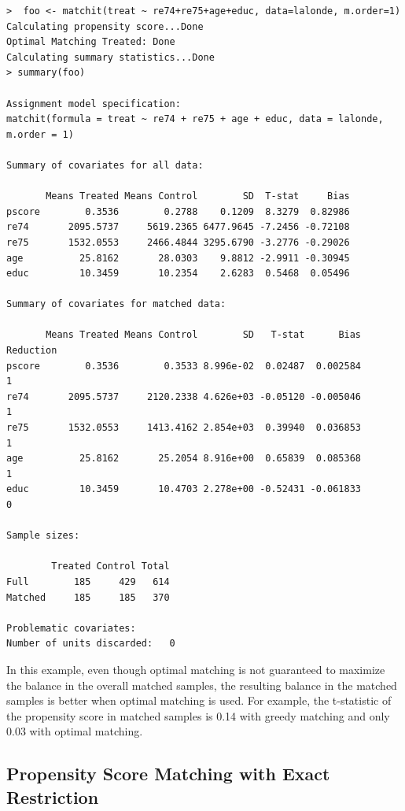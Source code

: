 \documentclass[oneside,letterpaper,titlepage]{article}
\begin{document}
\begin{verbatim}
>  foo <- matchit(treat ~ re74+re75+age+educ, data=lalonde, m.order=1)
Calculating propensity score...Done
Optimal Matching Treated: Done
Calculating summary statistics...Done
> summary(foo)

Assignment model specification:
matchit(formula = treat ~ re74 + re75 + age + educ, data = lalonde,     m.order = 1)

Summary of covariates for all data:

       Means Treated Means Control        SD  T-stat     Bias
pscore        0.3536        0.2788    0.1209  8.3279  0.82986
re74       2095.5737     5619.2365 6477.9645 -7.2456 -0.72108
re75       1532.0553     2466.4844 3295.6790 -3.2776 -0.29026
age          25.8162       28.0303    9.8812 -2.9911 -0.30945
educ         10.3459       10.2354    2.6283  0.5468  0.05496

Summary of covariates for matched data:

       Means Treated Means Control        SD   T-stat      Bias Reduction
pscore        0.3536        0.3533 8.996e-02  0.02487  0.002584         1
re74       2095.5737     2120.2338 4.626e+03 -0.05120 -0.005046         1
re75       1532.0553     1413.4162 2.854e+03  0.39940  0.036853         1
age          25.8162       25.2054 8.916e+00  0.65839  0.085368         1
educ         10.3459       10.4703 2.278e+00 -0.52431 -0.061833         0

Sample sizes:

        Treated Control Total
Full        185     429   614
Matched     185     185   370

Problematic covariates:  
Number of units discarded:   0
\end{verbatim}


In this example, even though optimal matching is not guaranteed to maximize the balance in the overall matched samples, 
the resulting balance in the matched samples is better when optimal matching is used.
For example, the t-statistic of the propensity score in matched samples is 0.14 with greedy matching and only 
0.03 with optimal matching.  

\subsection{Propensity Score Matching with Exact Restriction}
\end{document}
